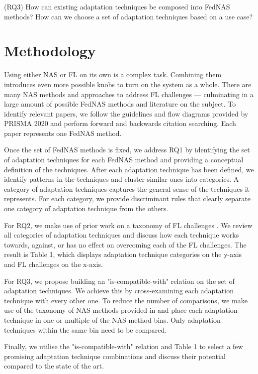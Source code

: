 \vspace{1em}
(RQ3) How can existing adaptation techniques be composed into FedNAS methods? How can we choose a set of adaptation techniques based on a use case?
\vspace{1em}

\section{Methodology}

Using either NAS or FL on its own is a complex task. Combining them introduces even more possible knobs to turn on the system as a whole. There are many NAS methods and approaches to address FL challenges — culminating in a large amount of possible FedNAS methods and literature on the subject. To identify relevant papers, we follow the guidelines and flow diagrams provided by PRISMA 2020 \cite{prisma_2020} and perform forward and backwards citation searching. Each paper represents one FedNAS method.

Once the set of FedNAS methods is fixed, we address RQ1 by identifying the set of adaptation techniques for each FedNAS method and providing a conceptual definition of the techniques. After each adaptation technique has been defined, we identify patterns in the techniques and cluster similar ones into categories. A category of adaptation techniques captures the general sense of the techniques it represents. For each category, we provide discriminant rules that clearly separate one category of adaptation technique from the others.

For RQ2, we make use of prior work on a taxonomy of FL challenges \cite{fl_taxonomy_2024}. We review all categories of adaptation techniques and discuss how each technique works towards, against, or has no effect on overcoming each of the FL challenges. The result is Table 1, which displays adaptation technique categories on the y-axis and FL challenges on the x-axis.

For RQ3, we propose building an "is-compatible-with" relation on the set of adaptation techniques. We achieve this by cross-examining each adaptation technique with every other one. To reduce the number of comparisons, we make use of the taxonomy of NAS methods provided in \cite{nas_1000_papers_2023} and place each adaptation technique in one or multiple of the NAS method bins. Only adaptation techniques within the same bin need to be compared.

Finally, we utilise the "is-compatible-with" relation and Table 1 to select a few promising adaptation technique combinations and discuss their potential compared to the state of the art.

